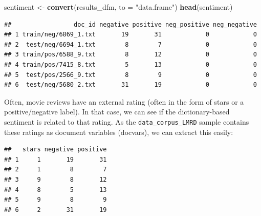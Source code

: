 \documentclass[
]{book}
\newenvironment{Shaded}{\begin{snugshade}}{\end{snugshade}}
\newcommand{\AttributeTok}[1]{\textcolor[rgb]{0.13,0.29,0.53}{#1}}
\newcommand{\CommentTok}[1]{\textcolor[rgb]{0.56,0.35,0.01}{\textit{#1}}}
\newcommand{\FunctionTok}[1]{\textcolor[rgb]{0.13,0.29,0.53}{\textbf{#1}}}
\newcommand{\NormalTok}[1]{#1}
\newcommand{\OtherTok}[1]{\textcolor[rgb]{0.56,0.35,0.01}{#1}}
\newcommand{\SpecialCharTok}[1]{\textcolor[rgb]{0.81,0.36,0.00}{\textbf{#1}}}
\newcommand{\StringTok}[1]{\textcolor[rgb]{0.31,0.60,0.02}{#1}}
\begin{document}
\begin{Shaded}
\begin{Highlighting}[]
\NormalTok{sentiment }\OtherTok{\textless{}{-}} \FunctionTok{convert}\NormalTok{(results\_dfm, }\AttributeTok{to =} \StringTok{"data.frame"}\NormalTok{)}
\FunctionTok{head}\NormalTok{(sentiment)}
\end{Highlighting}
\end{Shaded}

\begin{verbatim}
##                 doc_id negative positive neg_positive neg_negative
## 1 train/neg/6869_1.txt       19       31            0            0
## 2  test/neg/6694_1.txt        8        7            0            0
## 3 train/pos/6588_9.txt        8       12            0            0
## 4 train/pos/7415_8.txt        5       13            0            0
## 5  test/pos/2566_9.txt        8        9            0            0
## 6  test/neg/5680_2.txt       31       19            0            0
\end{verbatim}

Often, movie reviews have an external rating (often in the form of stars or a positive/negative label). In that case, we can see if the dictionary-based sentiment is related to that rating. As the \texttt{data\_corpus\_LMRD} sample contains these ratings as document variables (docvars), we can extract this easily:

\begin{Shaded}
\end{Shaded}

\begin{verbatim}
##   stars negative positive
## 1     1       19       31
## 2     1        8        7
## 3     9        8       12
## 4     8        5       13
## 5     9        8        9
## 6     2       31       19
\end{verbatim}
\end{document}
